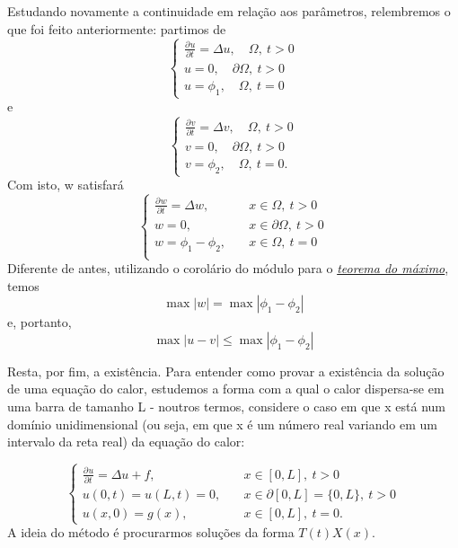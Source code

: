 \documentclass[../pde_notes.tex]{subfiles}
\begin{document}
Estudando novamente a continuidade em relação aos parâmetros, relembremos o que foi feito anteriormente: partimos de
\[
	\left\{\begin{array}{ll}
		\frac{\partial^{}u}{\partial t^{}}=\Delta u,\quad  \Omega ,\: t>0 \\
		u = 0, \quad  \partial \Omega ,\: t > 0                           \\
		u = \phi _1,\quad  \Omega ,\: t = 0
	\end{array}\right.
\]
e
\[
	\left\{\begin{array}{ll}
		\frac{\partial^{}v}{\partial t^{}}=\Delta v,\quad  \Omega ,\: t>0 \\
		v = 0, \quad  \partial \Omega ,\: t > 0                           \\
		v = \phi _2,\quad  \Omega ,\: t = 0.
	\end{array}\right.
\]
Com isto, w satisfará
\[
	\left\{\begin{array}{ll}
		\frac{\partial^{}w}{\partial t^{}}=\Delta w, & \quad x\in \Omega ,\: t > 0          \\
		w=0,                                         & \quad x\in \partial \Omega ,\: t > 0 \\
		w=\phi_{1}-\phi_{2},                         & \quad x\in \Omega ,\: t = 0          \\
	\end{array}\right.
\]
Diferente de antes, utilizando o corolário do módulo para o \hyperlink{strong_maximum}{\textit{teorema do máximo}}, temos
\[
	\max_{}|w|=\max_{}|\phi_{1}-\phi_{2} |
\]
e, portanto,
\[
	\max_{}|u-v|\leq \max_{}|\phi_{1}-\phi_{2}|
\]

Resta, por fim, a existência. Para entender como provar a existência da solução de uma equação do calor, estudemos a forma com a qual o calor dispersa-se em uma barra de tamanho L - noutros termos, considere o caso em que x está num domínio unidimensional (ou seja, em que x é um número real variando em um intervalo da reta real) da equação do calor:

\[
	\left\{\begin{array}{ll}
		\frac{\partial^{}u}{\partial t^{}}= \Delta u + f, & \quad x\in [0, L],\: t > 0                      \\
		u(0, t) = u(L, t) = 0,                            & \quad x\in \partial [0, L] = \{0, L\} ,\: t > 0 \\
		u(x, 0) = g(x),                                   & \quad x\in [0, L] ,\: t = 0.
	\end{array}\right.
\]
A ideia do método é procurarmos soluções da forma \(T(t)X(x)\).
\end{document}
